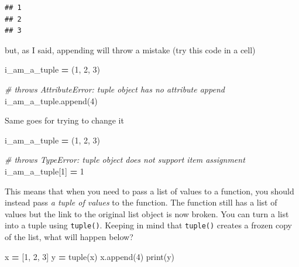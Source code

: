 \documentclass[
]{book}
\newenvironment{Shaded}{\begin{snugshade}}{\end{snugshade}}
\newcommand{\BuiltInTok}[1]{#1}
\newcommand{\CommentTok}[1]{\textcolor[rgb]{0.56,0.35,0.01}{\textit{#1}}}
\newcommand{\DecValTok}[1]{\textcolor[rgb]{0.00,0.00,0.81}{#1}}
\newcommand{\NormalTok}[1]{#1}
\newcommand{\OperatorTok}[1]{\textcolor[rgb]{0.81,0.36,0.00}{\textbf{#1}}}
\begin{document}
\begin{verbatim}
## 1
## 2
## 3
\end{verbatim}

but, as I said, appending will throw a mistake (try this code in a cell)

\begin{Shaded}
\begin{Highlighting}[]
\NormalTok{i\_am\_a\_tuple }\OperatorTok{=}\NormalTok{ (}\DecValTok{1}\NormalTok{, }\DecValTok{2}\NormalTok{, }\DecValTok{3}\NormalTok{)}

\CommentTok{\# throws AttributeError: \textquotesingle{}tuple\textquotesingle{} object has no attribute \textquotesingle{}append\textquotesingle{}}
\NormalTok{i\_am\_a\_tuple.append(}\DecValTok{4}\NormalTok{)}
\end{Highlighting}
\end{Shaded}

Same goes for trying to change it

\begin{Shaded}
\begin{Highlighting}[]
\NormalTok{i\_am\_a\_tuple }\OperatorTok{=}\NormalTok{ (}\DecValTok{1}\NormalTok{, }\DecValTok{2}\NormalTok{, }\DecValTok{3}\NormalTok{)}

\CommentTok{\# throws TypeError: \textquotesingle{}tuple\textquotesingle{} object does not support item assignment}
\NormalTok{i\_am\_a\_tuple[}\DecValTok{1}\NormalTok{] }\OperatorTok{=} \DecValTok{1} 
\end{Highlighting}
\end{Shaded}

This means that when you need to pass a list of values to a function, you should instead pass \emph{a tuple of values} to the function. The function still has a list of values but the link to the original list object is now broken. You can turn a list into a tuple using \texttt{tuple()}. Keeping in mind that \texttt{tuple()} creates a frozen copy of the list, what will happen below?

\begin{Shaded}
\begin{Highlighting}[]
\NormalTok{x }\OperatorTok{=}\NormalTok{ [}\DecValTok{1}\NormalTok{, }\DecValTok{2}\NormalTok{, }\DecValTok{3}\NormalTok{]}
\NormalTok{y }\OperatorTok{=} \BuiltInTok{tuple}\NormalTok{(x)}
\NormalTok{x.append(}\DecValTok{4}\NormalTok{)}
\BuiltInTok{print}\NormalTok{(y)}
\end{Highlighting}
\end{Shaded}
\end{document}
